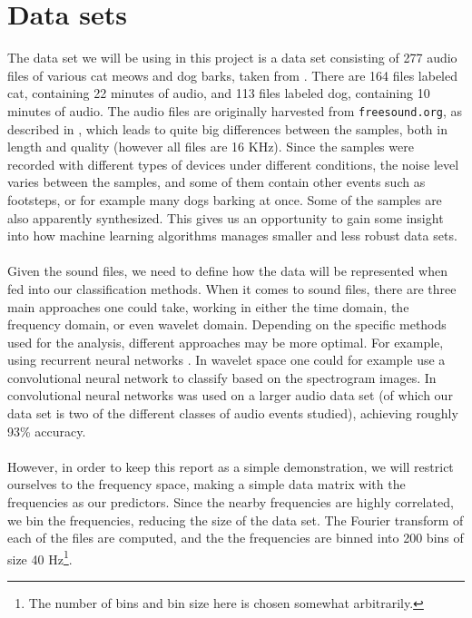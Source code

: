\documentclass[a4paper]{article}
\begin{document}
\section{Data sets} \label{chap:data_sets}
The data set we will be using in this project is a data set consisting of 277 audio files of various cat meows and dog barks, taken from \cite{Kaggle_catdog}. There are 164 files labeled cat, containing 22 minutes of audio, and 113 files labeled dog, containing 10 minutes of audio. The audio files are originally harvested from \texttt{freesound.org}, as described in \cite{Takahashi+2016}, which leads to quite big differences between the samples, both in length and quality (however all files are 16 KHz). Since the samples were recorded with different types of devices under different conditions, the noise level varies between the samples, and some of them contain other events such as footsteps, or for example many dogs barking at once. Some of the samples are also apparently synthesized. This gives us an opportunity to gain some insight into how machine learning algorithms manages smaller and less robust data sets.
\\\\
Given the sound files, we need to define how the data will be represented when fed into our classification methods. When it comes to sound files, there are three main approaches one could take, working in either the time domain, the frequency domain, or even wavelet domain. Depending on the specific methods used for the analysis, different approaches may be more optimal. For example, using recurrent neural networks \cite{phan2017audio}.
In wavelet space one could for example use a convolutional neural network to classify based on the spectrogram images. In \cite{Takahashi+2016} convolutional neural networks was used on a larger audio data set (of which our data set is two of the different classes of audio events studied), achieving roughly 93\% accuracy.
\\\\
However, in order to keep this report as a simple demonstration, we will restrict ourselves to the frequency space, making a simple data matrix with the frequencies as our predictors. Since the nearby frequencies are highly correlated, we bin the frequencies, reducing the size of the data set. The Fourier transform of each of the files are computed, and the the frequencies are binned into 200 bins of size 40 Hz\footnote{The number of bins and bin size here is chosen somewhat arbitrarily.}.
\end{document}
